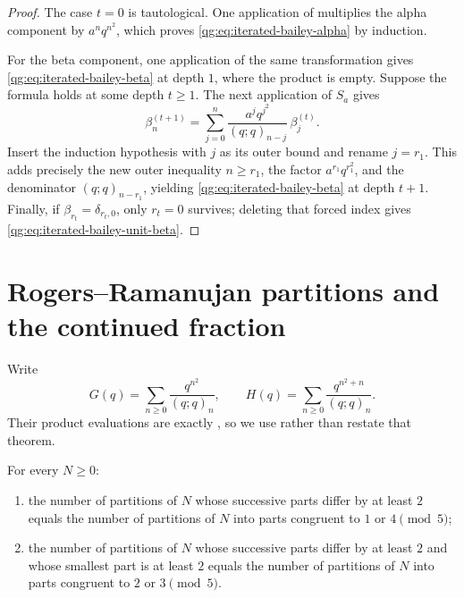 \begin{proof}
The case \(t=0\) is tautological.  One application of
 multiplies the alpha component by
\(a^nq^{n^2}\), which proves
\eqref{qg:eq:iterated-bailey-alpha} by induction.

For the beta component, one application of the same transformation gives
\eqref{qg:eq:iterated-bailey-beta} at depth \(1\), where the product is
empty.  Suppose the formula holds at some depth \(t\ge1\).  The next
application of \(S_a\) gives
\[
 \beta_n^{(t+1)}
 =\sum_{j=0}^{n}
   \frac{a^jq^{j^2}}{(q;q)_{n-j}}\,
   \beta_j^{(t)}.
\]
Insert the induction hypothesis with \(j\) as its outer bound and rename
\(j=r_1\).  This adds precisely the new outer inequality
\(n\ge r_1\), the factor
\(a^{r_1}q^{r_1^2}\), and the denominator
\((q;q)_{n-r_1}\), yielding
\eqref{qg:eq:iterated-bailey-beta} at depth \(t+1\).
Finally, if \(\beta_{r_t}=\delta_{r_t,0}\), only \(r_t=0\)
survives; deleting that forced index gives
\eqref{qg:eq:iterated-bailey-unit-beta}.
\end{proof}

\section{Rogers--Ramanujan partitions and the continued fraction}
\label{qg:sec:rogers-ramanujan-forms}

Write
\[
 G(q)=\sum_{n\ge0}\frac{q^{n^2}}{(q;q)_n},
 \qquad
 H(q)=\sum_{n\ge0}\frac{q^{n^2+n}}{(q;q)_n}.
\]
Their product evaluations are exactly
, so we use rather than restate that theorem.

\begin{corollary}
\label{qg:cor-rr-partitions}
For every \(N\ge0\):
\begin{enumerate}[label=\textup{(\roman*)}]
\item the number of partitions of \(N\) whose successive parts differ by
at least \(2\) equals the number of partitions of \(N\) into parts
congruent to \(1\) or \(4\pmod 5\);
\item the number of partitions of \(N\) whose successive parts differ by
at least \(2\) and whose smallest part is at least \(2\) equals the number
of partitions of \(N\) into parts congruent to \(2\) or \(3\pmod 5\).
\end{enumerate}
\end{corollary}

